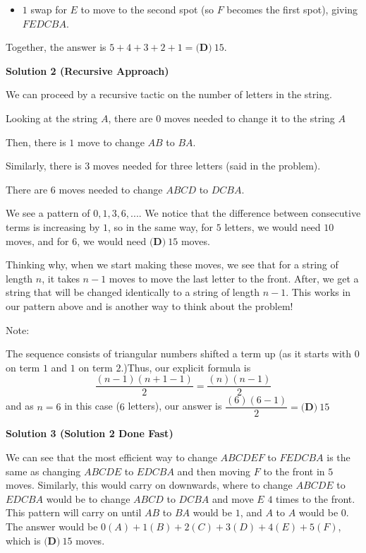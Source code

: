 \begin{enumerate}
            \begin{itemize}
        \item $1$ swap for $E$ to move to the second spot (so $F$ becomes the first spot), giving $FEDCBA.$
            \end{itemize}
            Together, the answer is $5+4+3+2+1=\boxed{\textbf{(D)}~15}.$




\textbf{Solution 2 (Recursive Approach)}

We can proceed by a recursive tactic on the number of letters in the string.

 Looking at the string $A$, there are $0$ moves needed to change it to the string $A$

 Then, there is $1$ move to change $AB$ to $BA$.

 Similarly, there is $3$ moves needed for three letters (said in the problem).

 There are $6$ moves needed to change $ABCD$ to $DCBA$.

 We see a pattern of $0,1,3,6,...$. We notice that the difference between consecutive terms is increasing by $1$, so in the same way, for $5$ letters, we would need $10$ moves, and for $6$, we would need $\boxed{\textbf{(D)}~15}$ moves.

 Thinking why, when we start making these moves, we see that for a string of length $n$, it takes $n-1$ moves to move the last letter to the front. After, we get a string that will be changed identically to a string of length $n-1$. This works in our pattern above and is another way to think about the problem!

 Note: 

 The sequence consists of triangular numbers shifted a term up (as it starts with $0$ on term $1$ and $1$ on term $2$.)Thus, our explicit formula is 
 \[\dfrac{(n-1)(n+1-1)}{2} = \dfrac{(n)(n-1)}{2}\] and as $n = 6$ in this case ($6$ letters), our answer is $\dfrac{(6)(6-1)}{2} = \boxed{\textbf{(D)}~15}$




\textbf{Solution 3 (Solution 2 Done Fast)}

We can see that the most efficient way to change $ABCDEF$ to $FEDCBA$ is the same as changing $ABCDE$ to $EDCBA$ and then moving $F$ to the front in $5$ moves. Similarly, this would carry on downwards, where to change $ABCDE$ to $EDCBA$ would be to change $ABCD$ to $DCBA$ and move $E$ $4$ times to the front. This pattern will carry on until $AB$ to $BA$ would be $1$, and $A$ to $A$ would be $0$. The answer would be $0(A)+1(B)+2(C)+3(D)+4(E)+5(F)$, which is $\boxed{\textbf{(D)}~15}$ moves.


\end{enumerate}
